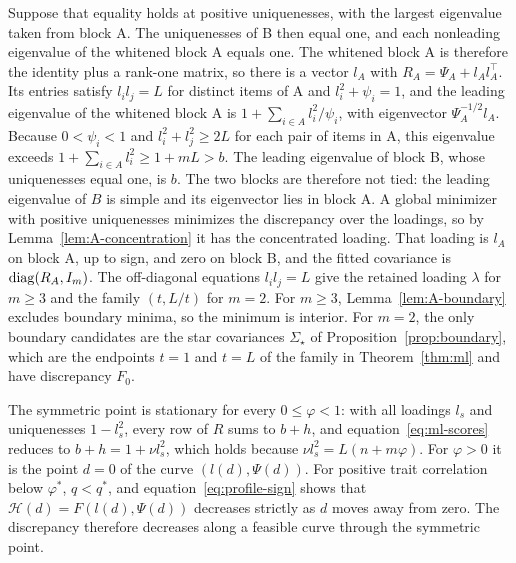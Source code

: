 Suppose that equality holds at positive uniquenesses, with the largest eigenvalue taken from block A. The uniquenesses of B then equal one, and each nonleading eigenvalue of the whitened block A equals one. The whitened block A is therefore the identity plus a rank-one matrix, so there is a vector $l_A$ with $R_A=\Psi_A+l_Al_A^{\top}$. Its entries satisfy $l_il_j=L$ for distinct items of A and $l_i^2+\psi_i=1$, and the leading eigenvalue of the whitened block A is $1+\sum_{i\in A}l_i^2/\psi_i$, with eigenvector $\Psi_A^{-1/2}l_A$. Because $0<\psi_i<1$ and $l_i^2+l_j^2\ge2L$ for each pair of items in A, this eigenvalue exceeds $1+\sum_{i\in A}l_i^2\ge1+mL>b$. The leading eigenvalue of block B, whose uniquenesses equal one, is $b$. The two blocks are therefore not tied: the leading eigenvalue of $B$ is simple and its eigenvector lies in block A. A global minimizer with positive uniquenesses minimizes the discrepancy over the loadings, so by Lemma~\ref{lem:A-concentration} it has the concentrated loading. That loading is $l_A$ on block A, up to sign, and zero on block B, and the fitted covariance is $\operatorname{diag}(R_A,I_m)$. The off-diagonal equations $l_il_j=L$ give the retained loading $\lambda$ for $m\ge3$ and the family $(t,L/t)$ for $m=2$. For $m\ge3$, Lemma~\ref{lem:A-boundary} excludes boundary minima, so the minimum is interior. For $m=2$, the only boundary candidates are the star covariances $\Sigma_\star$ of Proposition~\ref{prop:boundary}, which are the endpoints $t=1$ and $t=L$ of the family in Theorem~\ref{thm:ml} and have discrepancy $F_0$.

The symmetric point is stationary for every $0\le\varphi<1$: with all loadings $l_s$ and uniquenesses $1-l_s^2$, every row of $R$ sums to $b+h$, and equation~\eqref{eq:ml-scores} reduces to $b+h=1+\nu l_s^2$, which holds because $\nu l_s^2=L(n+m\varphi)$. For $\varphi>0$ it is the point $d=0$ of the curve $(l(d),\Psi(d))$. For positive trait correlation below $\varphi^*$, $q<q^*$, and equation~\eqref{eq:profile-sign} shows that $\mathcal H(d)=F(l(d),\Psi(d))$ decreases strictly as $d$ moves away from zero. The discrepancy therefore decreases along a feasible curve through the symmetric point.

